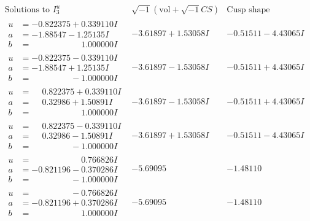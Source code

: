 \documentclass[1p]{elsarticle_modified}
\theoremstyle{definition}
\newcommand{\I}{\sqrt{-1}}
\begin{document}
$$\begin{array}{c|c|c}  
\text{Solutions to }I^u_{3}& \I (\text{vol} + \sqrt{-1}CS) & \text{Cusp shape}\\
 \hline 
\begin{aligned}
u &= -0.822375 + 0.339110 I \\
a &= -1.88547 - 1.25135 I \\
b &= \phantom{-0.000000 -}1.000000 I\end{aligned}
 & -3.61897 + 1.53058 I & -0.51511 - 4.43065 I \\ \hline\begin{aligned}
u &= -0.822375 - 0.339110 I \\
a &= -1.88547 + 1.25135 I \\
b &= \phantom{-0.000000 } -1.000000 I\end{aligned}
 & -3.61897 - 1.53058 I & -0.51511 + 4.43065 I \\ \hline\begin{aligned}
u &= \phantom{-}0.822375 + 0.339110 I \\
a &= \phantom{-}0.32986 + 1.50891 I \\
b &= \phantom{-0.000000 -}1.000000 I\end{aligned}
 & -3.61897 - 1.53058 I & -0.51511 + 4.43065 I \\ \hline\begin{aligned}
u &= \phantom{-}0.822375 - 0.339110 I \\
a &= \phantom{-}0.32986 - 1.50891 I \\
b &= \phantom{-0.000000 } -1.000000 I\end{aligned}
 & -3.61897 + 1.53058 I & -0.51511 - 4.43065 I \\ \hline\begin{aligned}
u &= \phantom{-0.000000 -}0.766826 I \\
a &= -0.821196 - 0.370286 I \\
b &= \phantom{-0.000000 } -1.000000 I\end{aligned}
 & -5.69095\phantom{ +0.000000I} & -1.48110\phantom{ +0.000000I} \\ \hline\begin{aligned}
u &= \phantom{-0.000000 } -0.766826 I \\
a &= -0.821196 + 0.370286 I \\
b &= \phantom{-0.000000 -}1.000000 I\end{aligned}
 & -5.69095\phantom{ +0.000000I} & -1.48110\phantom{ +0.000000I} \\ \hline\begin{aligned}

\end{aligned}
\end{array}$$
\end{document}
